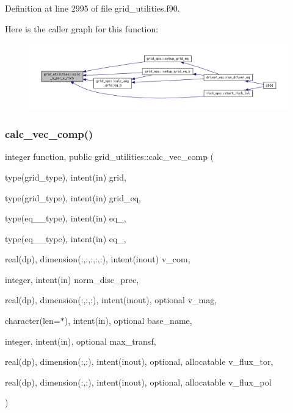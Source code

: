 Definition at line 2995 of file grid\+\_\+utilities.\+f90.

Here is the caller graph for this function\+:
\nopagebreak
\begin{figure}[H]
\begin{center}
\leavevmode
\includegraphics[width=350pt]{namespacegrid__utilities_adeb8c22db4d419a278d6fcc68a34100c_icgraph}
\end{center}
\end{figure}
\mbox{\label{namespacegrid__utilities_a3076796477d38ffed189868b3b28efb1}} 
\subsubsection{\texorpdfstring{calc\+\_\+vec\+\_\+comp()}{calc\_vec\_comp()}}
{\footnotesize\ttfamily integer function, public grid\+\_\+utilities\+::calc\+\_\+vec\+\_\+comp (\begin{DoxyParamCaption}\item[{type(grid\+\_\+type), intent(in)}]{grid,  }\item[{type(grid\+\_\+type), intent(in)}]{grid\+\_\+eq,  }\item[{type(eq\+\_\+1\+\_\+type), intent(in)}]{eq\+\_,  }\item[{type(eq\+\_\+2\+\_\+type), intent(in)}]{eq\+\_,  }\item[{real(dp), dimension(\+:,\+:,\+:,\+:,\+:), intent(inout)}]{v\+\_\+com,  }\item[{integer, intent(in)}]{norm\+\_\+disc\+\_\+prec,  }\item[{real(dp), dimension(\+:,\+:,\+:), intent(inout), optional}]{v\+\_\+mag,  }\item[{character(len=$\ast$), intent(in), optional}]{base\+\_\+name,  }\item[{integer, intent(in), optional}]{max\+\_\+transf,  }\item[{real(dp), dimension(\+:,\+:), intent(inout), optional, allocatable}]{v\+\_\+flux\+\_\+tor,  }\item[{real(dp), dimension(\+:,\+:), intent(inout), optional, allocatable}]{v\+\_\+flux\+\_\+pol }\end{DoxyParamCaption})}



